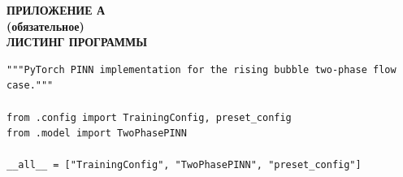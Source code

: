 \newpage
\begin{center}
  {\large\bfseries ПРИЛОЖЕНИЕ А}\\[8pt]
  \textbf{(обязательное)}\\[8pt]
  {\large\bfseries ЛИСТИНГ ПРОГРАММЫ}
\end{center}

\lstset{
  basicstyle=\ttfamily\footnotesize,
  breaklines=true,
  breakatwhitespace=false,
  columns=fullflexible,
  keepspaces=true,
  showstringspaces=false,
  frame=single,
  tabsize=4,
  language=Python,
}

\bigskip
{}
\nopagebreak
\begin{lstlisting}
"""PyTorch PINN implementation for the rising bubble two-phase flow case."""

from .config import TrainingConfig, preset_config
from .model import TwoPhasePINN

__all__ = ["TrainingConfig", "TwoPhasePINN", "preset_config"]
\end{lstlisting}

